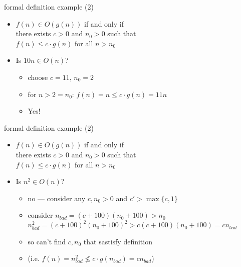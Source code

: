 \begin{frame}{formal definition example (2)}
    \begin{itemize}
    \item $f(n) \in O(g(n))$ if and only if \\
        \hspace{.5cm}there exists $c > 0$ and $n_0 > 0$ such that \\
        \hspace{.5cm}$f(n) \le c \cdot g(n)$ for all $n > n_0$
    \item Is $10n \in O(n)$?
        \begin{itemize}
        \item<2-> choose $c = 11$, $n_0 = 2$
        \item<2-> for $n > 2=n_0$: $f(n) = n \le c\cdot g(n) = 11n$
        \item<2-> Yes!
        \end{itemize}
    \end{itemize}
\end{frame}
\begin{frame}{formal definition example (2)}
    \begin{itemize}
    \item $f(n) \in O(g(n))$ if and only if \\
        \hspace{.5cm}there exists $c > 0$ and $n_0 > 0$ such that \\
        \hspace{.5cm}$f(n) \le c \cdot g(n)$ for all $n > n_0$
    \item Is $n^2 \in O(n)$?
        \begin{itemize}
        \item<2-> no --- consider any $c, n_0 > 0$ and $c' > \max\{c,1\}$
        \item<2-> consider $n_{bad} = (c + 100)(n_0 + 100) > n_0$ \\
            $n_{bad}^2 = (c + 100)^2(n_0 + 100)^2 > c(c + 100)(n_0 + 100) = cn_{bad}$ \\
        \item<2-> so can't find $c, n_0$ that sastisfy definition
        \item<2-> (i.e. $f(n) = n_{bad}^2 \not\le c \cdot g(n_{bad}) = c n_{bad}$)
        \end{itemize}
    \end{itemize}
\end{frame}

